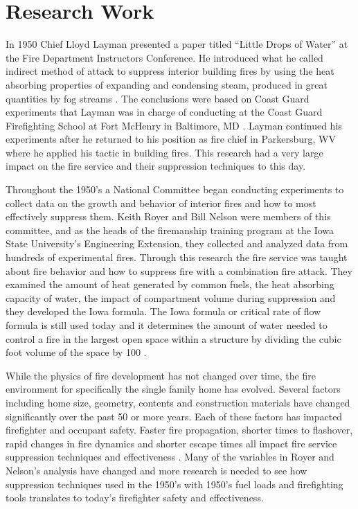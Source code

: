 \documentclass[12pt,oneside]{book}
\begin{document}

\section{Research Work}
In 1950 Chief Lloyd Layman presented a paper titled ``Little Drops of Water'' at the Fire Department Instructors Conference. He introduced what he called indirect method of attack to suppress interior building fires by using the heat absorbing properties of expanding and condensing steam, produced in great quantities by fog streams \cite{Fredricks:Little_Drops_of_Water}. The conclusions were based on Coast Guard experiments that Layman was in charge of conducting at the Coast Guard Firefighting School at Fort McHenry in Baltimore, MD \cite{ExtinguishingFires}. Layman continued his experiments after he returned to his position as fire chief in Parkersburg, WV where he applied his tactic in building fires.  This research had a very large impact on the fire service and their suppression techniques to this day. 

Throughout the 1950's a National Committee began conducting experiments to collect data on the growth and behavior of interior fires and how to most effectively suppress them. Keith Royer and Bill Nelson were members of this committee, and as the heads of the firemanship training program at the Iowa State University's Engineering Extension, they collected and analyzed data from hundreds of experimental fires. Through this research the fire service was taught about fire behavior and how to suppress fire with a combination fire attack. They examined the amount of heat generated by common fuels, the heat absorbing capacity of water, the impact of compartment volume during suppression and they developed the Iowa formula. The Iowa formula or critical rate of flow formula is still used today and it determines the amount of water needed to control a fire in the largest open space within a structure by dividing the cubic foot volume of the space by 100 \cite{Water_For_Firefighting_Royer_Nelson}.

While the physics of fire development has not changed over time, the fire environment for specifically the single family home has evolved. Several factors including home size, geometry, contents and construction materials have changed significantly over the past 50 or more years. Each of these factors has impacted firefighter and occupant safety. Faster fire propagation, shorter times to flashover, rapid changes in fire dynamics and shorter escape times all impact fire service suppression techniques and effectiveness \cite{DHS2008} \cite{DHS2010} \cite{Kerber:2}. Many of the variables in Royer and Nelson's analysis have changed and more research is needed to see how suppression techniques used in the 1950's with 1950's fuel loads and firefighting tools translates to today's firefighter safety and effectiveness.
\end{document}
